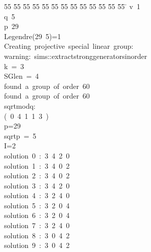 %
%
\begin{tabbing}
55 \= 55 \= 55 \= 55 \= 55 \= 55 \= 55 \= 55 \= 55 \= 55 \= 55 \= 55 \= 55 \= \kill
{}v\ 1\\[0pt]
q\ 5\\[0pt]
p\ 29\\[0pt]
Legendre(29\ 5)=1\\[0pt]
Creating\ projective\ special\ linear\ group:\\[0pt]
warning:\ sims::extractstronggeneratorsinorder\\[0pt]
k\ =\ 3\\[0pt]
SGlen\ =\ 4\\[0pt]
found\ a\ group\ of\ order\ 60\\[0pt]
found\ a\ group\ of\ order\ 60\\[0pt]
sqrtmodq:\\[0pt]
(\ 0\ 4\ 1\ 1\ 3\ )\\[0pt]
p=29\\[0pt]
sqrtp\ =\ 5\\[0pt]
I=2\\[0pt]
solution\ 0\ :\ 3\ 4\ 2\ 0\ \\[0pt]
solution\ 1\ :\ 3\ 4\ 0\ 2\ \\[0pt]
solution\ 2\ :\ 3\ 4\ 0\ 2\ \\[0pt]
solution\ 3\ :\ 3\ 4\ 2\ 0\ \\[0pt]
solution\ 4\ :\ 3\ 2\ 4\ 0\ \\[0pt]
solution\ 5\ :\ 3\ 2\ 0\ 4\ \\[0pt]
solution\ 6\ :\ 3\ 2\ 0\ 4\ \\[0pt]
solution\ 7\ :\ 3\ 2\ 4\ 0\ \\[0pt]
solution\ 8\ :\ 3\ 0\ 4\ 2\ \\[0pt]
solution\ 9\ :\ 3\ 0\ 4\ 2\ \\[0pt]

\end{tabbing}
